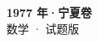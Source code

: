 \documentclass[zihao=-4, a4paper]{ctexart}
\begin{document}
\begin{center}
  {\Large\bfseries 1977 年·宁夏卷}\\[4pt]
  {\large 数学 · 试题版}
\end{center}
\medskip
{}

\end{document}
